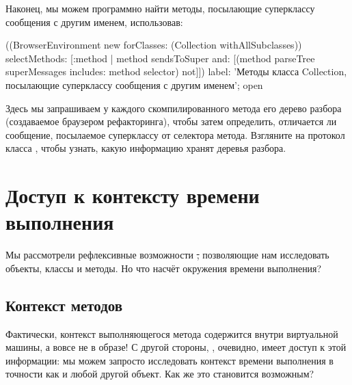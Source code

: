 \documentclass[a4paper,10pt,twoside]{book}
\begin{document}
Наконец, мы можем программно найти методы, посылающие суперклассу сообщения с другим именем, использовав:
\begin{code}{}
((BrowserEnvironment new forClasses: (Collection withAllSubclasses))
	selectMethods: [:method | 
		method sendsToSuper
		and: [(method parseTree superMessages includes: method selector) not]])
	label: 'Методы класса Collection, посылающие суперклассу сообщения с другим именем';
	open
\end{code}
Здесь мы запрашиваем у каждого скомпилированного метода его дерево разбора (создаваемое браузером рефакторинга), чтобы затем определить, отличается ли сообщение, посылаемое суперклассу от селектора метода.
Взгляните на протокол  класса , чтобы узнать, какую информацию хранят деревья разбора.

\section{Доступ к контексту времени выполнения}

Мы рассмотрели рефлексивные возможности \st, позволяющие нам исследовать объекты, классы и методы. Но что насчёт окружения времени выполнения?

\subsection{Контекст методов}

Фактически, контекст выполняющегося метода содержится внутри виртуальной машины, а вовсе не в образе!
С другой стороны, , очевидно, имеет доступ к этой информации: мы можем запросто исследовать контекст времени выполнения в точности как и любой другой объект.
Как же это становится возможным?
\end{document}
